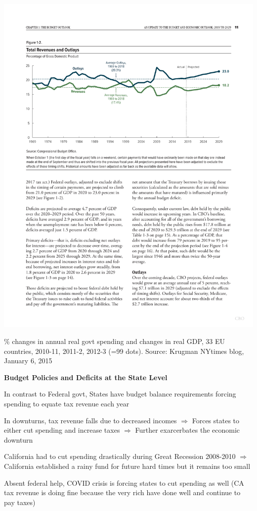 \documentclass[landscape]{slides}
\begin{document}
\begin{slide}
\includegraphics[page=10,scale=1.1]{budget_ch04_new_attach.pdf}

\small \% changes in annual real govt spending and changes in real GDP, 33 EU countries, 2010-11, 2011-2, 2012-3
(=99 dots). Source: Krugman NYtimes blog, January 6, 2015
\end{slide}


\begin{slide}
\begin{center}
{\bf Budget Policies and Deficits at the State Level}
\end{center}
In contrast to Federal govt, States have budget balance requirements
forcing spending to equate tax revenue each year

In downturns, tax revenue falls due to decreased incomes $\Rightarrow$ Forces states
to either cut spending and increase taxes $\Rightarrow$ Further exarcerbates the economic downturn

California had to cut spending drastically during Great Recession 2008-2010
$\Rightarrow$ California established a rainy fund for future hard times but it remains too small

Absent federal help, COVID crisis is forcing states to cut spending as well
(CA tax revenue is doing fine because the very rich have done well and continue to pay taxes)

\end{slide}
\end{document}
